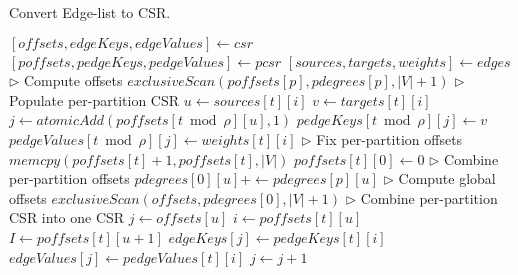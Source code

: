 \begin{algorithm}[hbtp]
\caption{Convert Edge-list to CSR.}
\label{alg:csr}
\begin{algorithmic}[1]

\Statex

  \State $[offsets, edgeKeys, edgeValues] \gets csr$
  \State $[poffsets, pedgeKeys, pedgeValues] \gets pcsr$
  \State $[sources, targets, weights] \gets edges$
  \State $\rhd$ Compute offsets
  \ForAll{$p \in [0, \rho)$}
    \State $exclusiveScan(poffsets[p], pdegrees[p], |V|+1)$
  \EndFor
  \State $\rhd$ Populate per-partition CSR
    \ForAll{$i \in [0, counts[t])$}
      \State $u \gets sources[t][i]$
      \State $v \gets targets[t][i]$
      \State $j \gets atomicAdd(poffsets[t \bmod \rho][u], 1)$
      \State $pedgeKeys[t \bmod \rho][j] \gets v$
        \State $pedgeValues[t \bmod \rho][j] \gets weights[t][i]$
      \EndIf
    \EndFor
  \EndFor
  \State $\rhd$ Fix per-partition offsets
      \State $memcpy(poffsets[t]+1, poffsets[t], |V|)$
      \State $poffsets[t][0] \gets 0$
    \EndIf
  \EndFor
  \State $\rhd$ Combine per-partition offsets
  \ForAll{$u \in [0, |V|)$ \textbf{in parallel}}
    \ForAll{$p \in [1, \rho)$}
      \State $pdegrees[0][u] +\gets pdegrees[p][u]$
    \EndFor
  \EndFor
  \State $\rhd$ Compute global offsets
  \State $exclusiveScan(offsets, pdegrees[0], |V|+1)$
  \State $\rhd$ Combine per-partition CSR into one CSR
  \ForAll{$u \in [0, |V|)$ \textbf{in parallel}}
    \State $j \gets offsets[u]$
    \ForAll{$p \in [0, \rho)$}
      \State $i \gets poffsets[t][u]$
      \State $I \gets poffsets[t][u+1]$
      \ForAll{$i \in [i, I)$}
        \State $edgeKeys[j] \gets pedgeKeys[t][i]$
          \State $edgeValues[j] \gets pedgeValues[t][i]$
        \EndIf
        \State $j \gets j + 1$
      \EndFor
    \EndFor
  \EndFor
\EndFunction \label{alg:frontier--main-end}
\end{algorithmic}
\end{algorithm}




